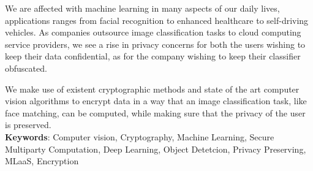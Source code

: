 We are affected with machine learning in many aspects of our daily lives, applications ranges from facial recognition to enhanced healthcare to self-driving vehicles. As companies outsource image classification tasks to cloud computing service providers, we see a rise in privacy concerns for both the users wishing to keep their data confidential, as for the company wishing to keep their classifier obfuscated.

We make use of existent cryptographic methods and state of the art computer vision algorithms to encrypt data in a way that an image classification task, like face matching, can be computed, while making sure that the privacy of the user is preserved.\\

\textbf{Keywords}: Computer vision, Cryptography, Machine Learning, Secure Multiparty Computation, Deep Learning, Object Detetcion, Privacy Preserving, MLaaS, Encryption
